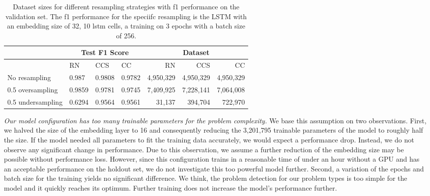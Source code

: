 \begin{table}[]
    \tabcolsep=0.11cm
    \begin{tabularx}{\textwidth}{lXXX|rrr}
    \toprule
                        & \multicolumn{3}{c}{Test F1 Score} & \multicolumn{3}{c}{Dataset}   \\ \midrule
                        & RN        & CCS        & CC     & RN            & CCS         & CC          \\ \midrule
    No resampling     &  0.987   &  0.9808    &  0.9782  &  4,950,329    & 4,950,329   & 4,950,329   \\
    0.5 oversampling  &  0.9859   &  0.9781   &  0.9745  &  7,409,925    & 7,228,141   & 7,064,008   \\
    0.5 undersampling &  0.6294   &  0.9564   &  0.9561  &  31,137       & 394,704     & 722,970     \\ \bottomrule
    \end{tabularx}
    \caption[Dataset sizes for different resampling strategies and performance for random forest classifier]{Dataset sizes for different resampling strategies with f1 performance on the validation set. The f1 performance for the speciifc resampling is the LSTM with an embedding size of 32, 10 lstm cells, a training on 3 epochs with a batch size of 256.}
    \label{tab:resampling_size_performance_lstm}
\end{table}


\textit{Our model configuration has too many trainable parameters for the problem complexity.} We base this assumption on two observations. First, we halved the size of the embedding layer to 16 and consequently reducing the 3,201,795 trainable parameters of the model to roughly half the size. If the model needed all parameters to fit the training data accurately, we would expect a performance drop. Instead, we do not observe any significant change in performance. Due to this observation, we assume a further reduction of the embedding size may be possible without performance loss. However, since this configuration trains in a reasonable time of under an hour without a GPU and has an acceptable performance on the holdout set, we do not investigate this too powerful model further.
Second, a variation of the epochs and batch size for the training yields no significant difference. We think, the problem detection for our problem types is too simple for the model and it quickly reaches its optimum. Further training does not increase the model's performance further. 

\begin{center}
\end{center}

